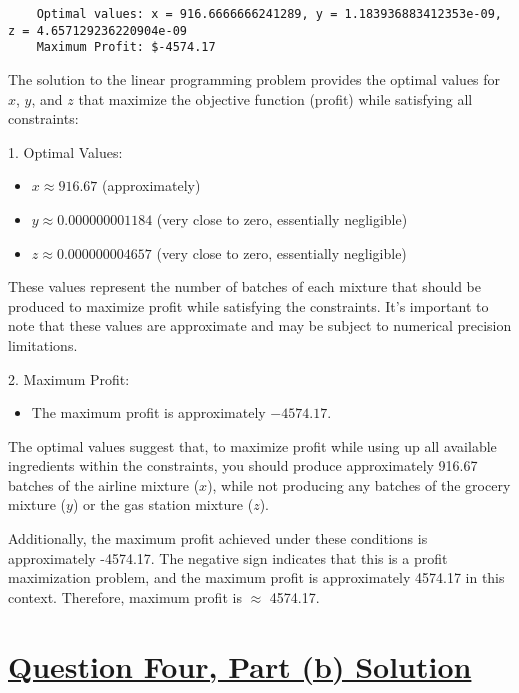 \documentclass{article}
\begin{document}
\begin{verbatim}
    Optimal values: x = 916.6666666241289, y = 1.183936883412353e-09, z = 4.657129236220904e-09
    Maximum Profit: $-4574.17
\end{verbatim}

The solution to the linear programming problem provides the optimal values for $x$, $y$, and $z$ that maximize the objective function (profit) while satisfying all constraints:

1. Optimal Values:
   \begin{itemize}
   \item $x \approx 916.67$ (approximately)
   \item $y \approx 0.000000001184$ (very close to zero, essentially negligible)
   \item $z \approx 0.000000004657$ (very close to zero, essentially negligible)
   \end{itemize}

   These values represent the number of batches of each mixture that should be produced to maximize profit while satisfying the constraints. It's important to note that these values are approximate and may be subject to numerical precision limitations.

2. Maximum Profit:
   \begin{itemize}
   \item The maximum profit is approximately $-4574.17$.
   \end{itemize}

   The optimal values suggest that, to maximize profit while using up all available ingredients within the constraints, you should produce approximately 916.67 batches of the airline mixture ($x$), while not producing any batches of the grocery mixture ($y$) or the gas station mixture ($z$).

   Additionally, the maximum profit achieved under these conditions is approximately \textdollar{}-4574.17. The negative sign indicates that this is a profit maximization problem, and the maximum profit is approximately \textdollar{}4574.17 in this context.
Therefore, maximum profit is $\approx$ \textdollar{}4574.17.

\section*{\uline{\large Question Four, Part (b) Solution}}
\end{document}
